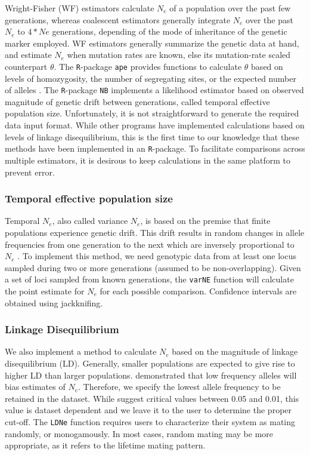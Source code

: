 \documentclass[english,titlepage]{article}
\begin{document}
Wright-Fisher (WF) estimators calculate $N_e$ of a population over the past few generations, whereas coalescent estimators generally integrate $N_e$ over the past $N_e$ to $4*Ne$ generations, depending of the mode of inheritance of the genetic marker employed. WF estimators generally summarize the genetic data at hand, and estimate $N_e$ when mutation rates are known, else its mutation-rate scaled counterpart $\theta$. The \texttt{R}-package \texttt{ape} provides functions to calculate $\theta$ based on levels of homozygosity, the number of segregating sites, or the expected number of alleles \citep{Paradis2004}. The \texttt{R}-package \texttt{NB} implements a likelihood estimator based on observed magnitude of genetic drift between generations, called temporal effective population size. Unfortunately, it is not straightforward to generate the required data input format. While other programs have implemented calculations based on levels of linkage disequilibrium, this is the first time to our knowledge that these methods have been implemented in an \texttt{R}-package. To facilitate comparisons across multiple estimators, it is desirous to keep calculations in the same platform to prevent error.

\subsubsection*{Temporal effective population size}

Temporal $N_e$, also called variance $N_e$, is based on the premise that finite populations experience genetic drift. This drift results in random changes in allele frequencies from one generation to the next which are inversely proportional to $N_e$ \citep{Nei1981}. To implement this method, we need genotypic data from at least one locus sampled during two or more generations (assumed to be non-overlapping).  Given a set of loci sampled from known generations, the \texttt{varNE} function will calculate the point estimate for $N_e$ for each possible comparison. Confidence intervals are obtained using jackknifing. 

\subsubsection*{Linkage Disequilibrium}

We also implement a method to calculate $N_e$ based on the magnitude of linkage disequilibrium (LD). Generally, smaller populations are expected to give rise to higher LD than larger populations. 
\cite{Waples2006} demonstrated that low frequency alleles will bias estimates of $N_e$. Therefore, we specify the lowest allele frequency to be retained in the dataset.  While \cite{Waples2008} suggest critical values between 0.05 and 0.01, this value is dataset dependent and we leave it to the user to determine the proper cut-off. The \texttt{LDNe} function requires users to characterize their system as mating randomly, or monogamously. In most cases, random mating may be more appropriate, as it refers to the lifetime mating pattern. 
\end{document}
